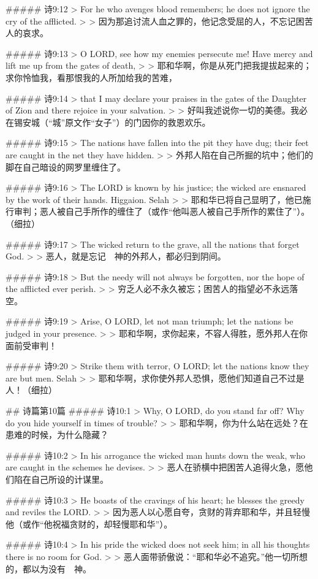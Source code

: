 ##### 诗9:12
> For he who avenges blood remembers; he does not ignore the cry of the afflicted.
>
> 因为那追讨流人血之罪的，他记念受屈的人，不忘记困苦人的哀求。


##### 诗9:13
> O LORD, see how my enemies persecute me! Have mercy and lift me up from the gates of death,
>
> 耶和华啊，你是从死门把我提拔起来的；求你怜恤我，看那恨我的人所加给我的苦难，


##### 诗9:14
> that I may declare your praises in the gates of the Daughter of Zion and there rejoice in your salvation.
>
> 好叫我述说你一切的美德。我必在锡安城（“城”原文作“女子”）的门因你的救恩欢乐。


##### 诗9:15
> The nations have fallen into the pit they have dug; their feet are caught in the net they have hidden.
>
> 外邦人陷在自己所掘的坑中；他们的脚在自己暗设的网罗里缠住了。


##### 诗9:16
> The LORD is known by his justice; the wicked are ensnared by the work of their hands. Higgaion. Selah
>
> 耶和华已将自己显明了，他已施行审判；恶人被自己手所作的缠住了（或作“他叫恶人被自己手所作的累住了”）。（细拉）


##### 诗9:17
> The wicked return to the grave, all the nations that forget God.
>
> 恶人，就是忘记　神的外邦人，都必归到阴间。


##### 诗9:18
> But the needy will not always be forgotten, nor the hope of the afflicted ever perish.
>
> 穷乏人必不永久被忘；困苦人的指望必不永远落空。


##### 诗9:19
> Arise, O LORD, let not man triumph; let the nations be judged in your presence.
>
> 耶和华啊，求你起来，不容人得胜，愿外邦人在你面前受审判！


##### 诗9:20
> Strike them with terror, O LORD; let the nations know they are but men. Selah
>
> 耶和华啊，求你使外邦人恐惧，愿他们知道自己不过是人！（细拉）


## 诗篇第10篇
##### 诗10:1
> Why, O LORD, do you stand far off? Why do you hide yourself in times of trouble?
>
> 耶和华啊，你为什么站在远处？在患难的时候，为什么隐藏？


##### 诗10:2
> In his arrogance the wicked man hunts down the weak, who are caught in the schemes he devises.
>
> 恶人在骄横中把困苦人追得火急，愿他们陷在自己所设的计谋里。


##### 诗10:3
> He boasts of the cravings of his heart; he blesses the greedy and reviles the LORD.
>
> 因为恶人以心愿自夸，贪财的背弃耶和华，并且轻慢他（或作“他祝福贪财的，却轻慢耶和华”）。


##### 诗10:4
> In his pride the wicked does not seek him; in all his thoughts there is no room for God.
>
> 恶人面带骄傲说：“耶和华必不追究。”他一切所想的，都以为没有　神。


